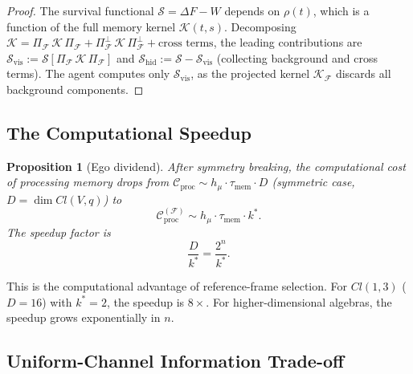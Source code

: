 \documentclass[12pt,a4paper,openany]{book}
\newtheorem{proposition}[theorem]{Proposition}
\begin{document}
\begin{proof}
The survival functional $\mathcal{S} = \Delta F - W$ depends
on $\rho(t)$, which is a function of the full memory kernel
$\mathcal{K}(t,s)$.
Decomposing
$\mathcal{K} = \Pi_{\mathcal{F}}\,\mathcal{K}\,
\Pi_{\mathcal{F}}
+ \Pi_{\mathcal{F}}^{\perp}\,\mathcal{K}\,
\Pi_{\mathcal{F}}^{\perp}
+ \text{cross terms}$,
the leading contributions are
$\mathcal{S}_{\mathrm{vis}} := \mathcal{S}[
\Pi_{\mathcal{F}}\,\mathcal{K}\,\Pi_{\mathcal{F}}]$
and
$\mathcal{S}_{\mathrm{hid}} := \mathcal{S} -
\mathcal{S}_{\mathrm{vis}}$
(collecting background and cross terms).
The agent computes only
$\mathcal{S}_{\mathrm{vis}}$, as the projected kernel
$\mathcal{K}_{\mathcal{F}}$ discards all background
components.
\end{proof}

\subsection{The Computational Speedup}
\label{T-II-subsec:speedup}

\begin{proposition}[Ego dividend]
\label{T-II-prop:speedup}
After symmetry breaking, the computational cost of
processing memory drops from
$\mathcal{C}_{\mathrm{proc}} \sim h_\mu \cdot
\tau_{\mathrm{mem}} \cdot D$
(symmetric case, $D = \dim Cl(V,q)$) to
\begin{equation}
\label{T-II-eq:speedup}
\mathcal{C}_{\mathrm{proc}}^{(\mathcal{F})}
\sim h_\mu \cdot \tau_{\mathrm{mem}}
     \cdot k^*.
\end{equation}
The speedup factor is
\begin{equation}
\label{T-II-eq:speedup_factor}
\frac{D}{k^*} = \frac{2^n}{k^*}.
\end{equation}
\end{proposition}

This is the computational advantage of reference-frame
selection.
For $Cl(1,3)$ ($D = 16$) with $k^* = 2$, the speedup is
$8\times$.
For higher-dimensional algebras, the speedup grows
exponentially in $n$.

\subsection{Uniform-Channel Information Trade-off}
\label{T-II-subsec:tradeoff}
\end{document}

